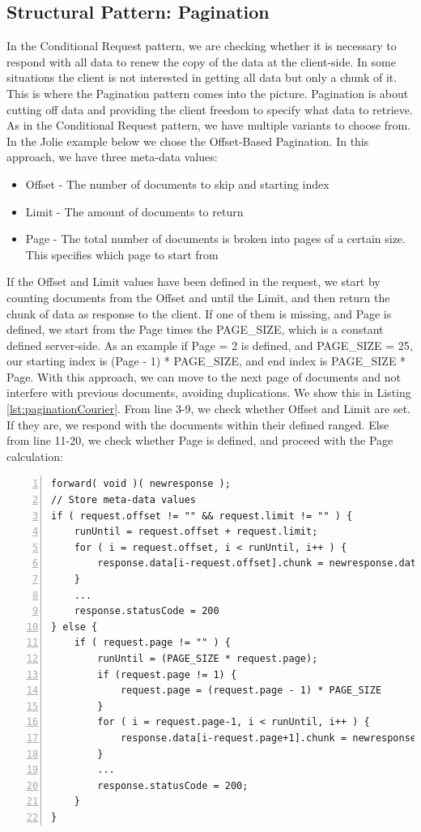 \documentclass[12pt]{article}
\begin{document}
\subsection{Structural Pattern: Pagination}
In the Conditional Request pattern, we are checking whether it is necessary to respond with all data to renew the copy of the data at the client-side. In some situations the client is not interested in getting all data but only a chunk of it. This is where the Pagination pattern \cite{PaginationMAPI} comes into the picture. Pagination is about cutting off data and providing the client freedom to specify what data to retrieve. As in the Conditional Request pattern, we have multiple variants to choose from. In the Jolie example below we chose the Offset-Based Pagination. In this approach, we have three meta-data values: 

\begin{itemize}
    \item Offset - The number of documents to skip and starting index
    \item Limit - The amount of documents to return
    \item Page - The total number of documents is broken into pages of a certain size. This specifies which page to start from
\end{itemize}

If the Offset and Limit values have been defined in the request, we start by counting documents from the Offset and until the Limit, and then return the chunk of data as response to the client. If one of them is missing, and Page is defined, we start from the Page times the PAGE\_SIZE, which is a constant defined server-side. As an example if Page = 2 is defined, and PAGE\_SIZE = 25, our starting index is (Page - 1) * PAGE\_SIZE, and end index is PAGE\_SIZE * Page. With this approach, we can move to the next page of documents and not interfere with previous documents, avoiding duplications. We show this in Listing \ref{lst:paginationCourier}. From line 3-9, we check whether Offset and Limit are set. If they are, we respond with the documents within their defined ranged. Else from line 11-20, we check whether Page is defined, and proceed with the Page calculation:
\newpage
\begin{lstlisting}[caption=Courier operations for the Pagination Service, 
    captionpos=b, label={lst:paginationCourier}, frame=single, breaklines=true, numbers=left, basicstyle=\scriptsize]
forward( void )( newresponse );
// Store meta-data values
if ( request.offset != "" && request.limit != "" ) {
    runUntil = request.offset + request.limit;
    for ( i = request.offset, i < runUntil, i++ ) {
        response.data[i-request.offset].chunk = newresponse.data[i].chunk
    }
    ...
    response.statusCode = 200
} else {
    if ( request.page != "" ) {
        runUntil = (PAGE_SIZE * request.page);
        if (request.page != 1) {
            request.page = (request.page - 1) * PAGE_SIZE
        }
        for ( i = request.page-1, i < runUntil, i++ ) {
            response.data[i-request.page+1].chunk = newresponse.data[i].chunk
        }
        ...
        response.statusCode = 200;
    }
}   
\end{lstlisting}
\end{document}
